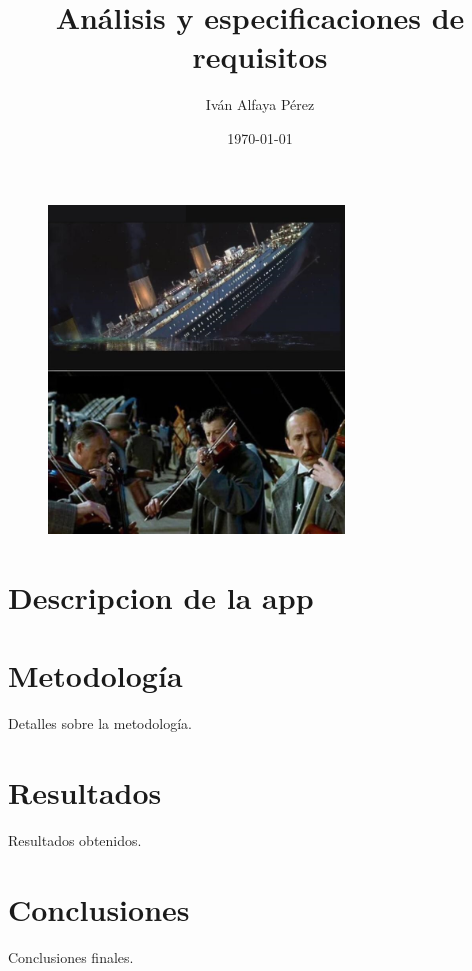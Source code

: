 \documentclass{article}
\title{Análisis y especificaciones de requisitos}
\author{Iván Alfaya Pérez}
\date{\today}
\begin{document}
\maketitle

\begin{figure}[h!]
    \centering
    \includegraphics[width=0.7\textwidth]{img1.jpg}
\end{figure}

\clearpage 

\tableofcontents %
\clearpage 

\section{Descripcion de la app}


\section{Metodología}
Detalles sobre la metodología.


\section{Resultados}
Resultados obtenidos.

\section{Conclusiones}
Conclusiones finales.
\end{document}
